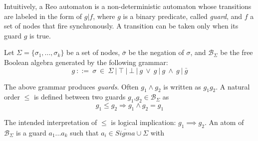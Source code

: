 Intuitively, a Reo automaton is a non-deterministic automaton whose
transitions are labeled in the form of $g|f$, where $g$ is a binary predicate, called \emph{guard}, and $f$ a set of nodes that fire synchronously. A transition can be taken only when its guard $g$ is true. 

Let $\Sigma = \{\sigma_1,...,\sigma_k\}$ be a set of nodes, $\bar{\sigma}$ be the negation of $\sigma$, and $\mathcal{B}_{\Sigma}$ be the free Boolean algebra generated by the following grammar:
$$g\ ::=\ \sigma\ \in\ \Sigma\ |\ \top\ |\ \bot\ |\ g\ \vee\ g\ |\ g\ \wedge\ g\ |\ \bar{g}$$

The above grammar produces \emph{guards}. Often $g_1 \wedge g_2$ is written as $g_1 g_2$. A natural order $\leq$ is defined between two guards $g_1$,$g_2 \in \mathcal{B}_{\Sigma}$ as
$$g_1 \leq g_2 \Rightarrow g_1 \wedge g_2 = g_1$$

The intended interpretation of $\leq$ is logical implication: $g_1 \implies g_2$. An
atom of $\mathcal{B}_{\Sigma}$ is a guard $a_1 ... a_k$ such that $a_i \in \bar{Sigma} \cup \Sigma$ with 

